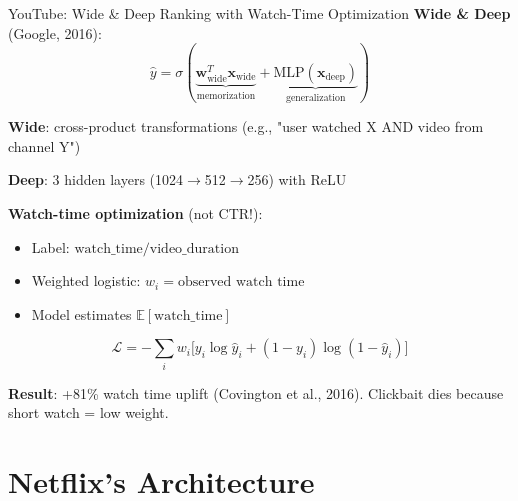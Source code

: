 \documentclass[aspectratio=169, 11pt]{beamer}
\begin{document}
\begin{frame}{YouTube: Wide \& Deep Ranking with Watch-Time Optimization}
\small
\textbf{Wide \& Deep} (Google, 2016):
\begin{equation*}
\hat{y} = \sigma(\underbrace{\mathbf{w}_{\text{wide}}^T \mathbf{x}_{\text{wide}}}_{\text{memorization}} + \underbrace{\text{MLP}(\mathbf{x}_{\text{deep}})}_{\text{generalization}})
\end{equation*}

\vspace{0.1cm}
\textbf{Wide}: cross-product transformations (e.g., "user watched X AND video from channel Y")

\textbf{Deep}: 3 hidden layers (1024$\to$512$\to$256) with ReLU

\vspace{0.1cm}
\textbf{Watch-time optimization} (not CTR!):
\begin{itemize}
    \item Label: $\text{watch\_time} / \text{video\_duration}$
    \item Weighted logistic: $w_i = \text{observed watch time}$
    \item Model estimates $\mathbb{E}[\text{watch\_time}]$
\end{itemize}

\vspace{0.1cm}
\begin{equation*}
\mathcal{L} = -\sum_i w_i\bigl[y_i\log\hat{y}_i + (1-y_i)\log(1-\hat{y}_i)\bigr]
\end{equation*}

\vspace{0.1cm}
\textbf{Result}: +81\% watch time uplift (Covington et al., 2016). Clickbait dies because short watch = low weight.
\end{frame}

\section{Netflix's Architecture}
\end{document}
